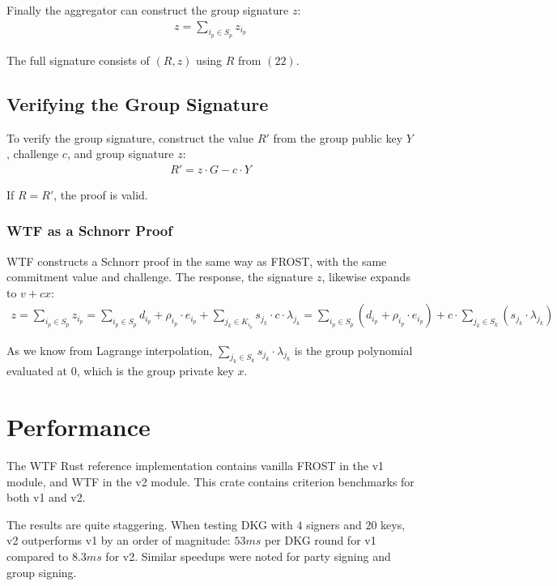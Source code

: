 \documentclass{article}
\begin{document}
Finally the aggregator can construct the group signature $z$:
\begin{align}
  z = \sum_{i_p \in S_p}^{} z_{i_p}
\end{align}

The full signature consists of $(R, z)$ using $R$ from $(22)$.

\subsection{
  Verifying the Group Signature
}

To verify the group signature, construct the value $R'$ from the group public key $Y$, challenge $c$, and group signature $z$:
\begin{align}
  R' = z \cdot G - c \cdot Y
\end{align}

If $R = R'$, the proof is valid.

\subsubsection{
  WTF as a Schnorr Proof
}

WTF constructs a Schnorr proof in the same way as FROST, with the same commitment value and challenge.  The response, the signature $z$, likewise expands to $v + cx$:
\begin{align}
  z = \sum_{i_p \in S_p}^{} z_{i_p} = \sum_{i_p \in S_p}^{} d_{i_p} + \rho_{i_p} \cdot e_{i_p} + \sum_{j_k \in K_{i_p}}^{} s_{j_k} \cdot c \cdot \lambda_{j_k} = \sum_{i_p \in S_p}^{} (d_{i_p} + \rho_{i_p} \cdot e_{i_p}) + c \cdot \sum_{j_k \in S_k}^{} (s_{j_k} \cdot \lambda_{j_k})\nonumber
\end{align}

As we know from Lagrange interpolation, $\sum_{j_k \in S_k}^{} s_{j_k} \cdot \lambda_{j_k}$ is the group polynomial evaluated at $0$, which is the group private key $x$.

\newpage
\onecolumn
\section{
  Performance
}

The WTF Rust reference implementation \cite{tmfrost} contains vanilla FROST in the v1 module, and WTF in the v2 module.  This crate contains criterion benchmarks for both v1 and v2.

The results are quite staggering.  When testing DKG with $4$ signers and $20$ keys, v2 outperforms v1 by an order of magnitude: $53 ms$ per DKG round for v1 compared to $8.3 ms$ for v2.  Similar speedups were noted for party signing and group signing.
\end{document}
